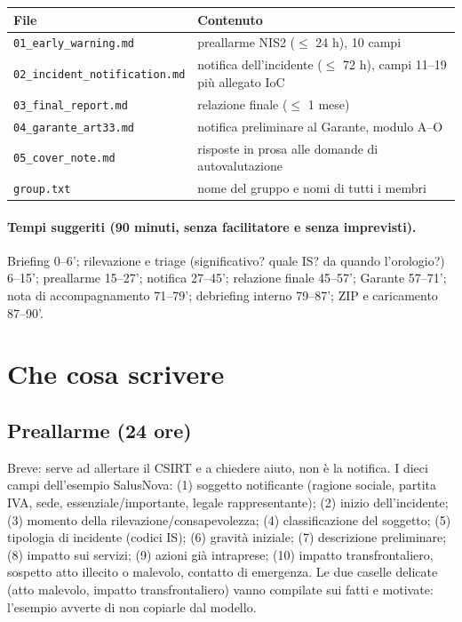 \begin{center}
\small
\begin{tabularx}{\linewidth}{l X}
\toprule
\textbf{File} & \textbf{Contenuto}\\
\midrule
\texttt{01\_early\_warning.md} & preallarme NIS2 ($\le$ 24 h), 10 campi\\
\texttt{02\_incident\_notification.md} & notifica dell'incidente ($\le$ 72 h), campi 11--19 più
  allegato IoC\\
\texttt{03\_final\_report.md} & relazione finale ($\le$ 1 mese)\\
\texttt{04\_garante\_art33.md} & notifica preliminare al Garante, modulo A--O\\
\texttt{05\_cover\_note.md} & risposte in prosa alle domande di autovalutazione\\
\texttt{group.txt} & nome del gruppo e nomi di tutti i membri\\
\bottomrule
\end{tabularx}
\end{center}

\paragraph{Tempi suggeriti (90 minuti, senza facilitatore e senza imprevisti).} Briefing 0--6';
rilevazione e triage (significativo? quale IS? da quando l'orologio?) 6--15'; preallarme 15--27';
notifica 27--45'; relazione finale 45--57'; Garante 57--71'; nota di accompagnamento 71--79';
debriefing interno 79--87'; ZIP e caricamento 87--90'.

\section{Che cosa scrivere}

\subsection{Preallarme (24 ore)}
Breve: serve ad allertare il CSIRT e a chiedere aiuto, non è la notifica. I dieci campi dell'esempio
SalusNova: (1) soggetto notificante (ragione sociale, partita IVA, sede, essenziale/importante, legale
rappresentante); (2) inizio dell'incidente; (3) momento della rilevazione/consapevolezza; (4)
classificazione del soggetto; (5) tipologia di incidente (codici IS); (6) gravità iniziale; (7)
descrizione preliminare; (8) impatto sui servizi; (9) azioni già intraprese; (10) impatto
transfrontaliero, sospetto atto illecito o malevolo, contatto di emergenza. Le due caselle delicate
(atto malevolo, impatto transfrontaliero) vanno compilate sui fatti e motivate: l'esempio avverte di non
copiarle dal modello.

